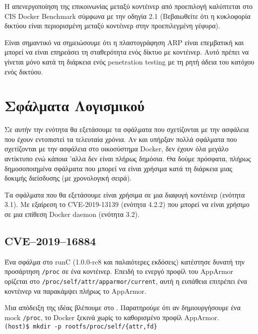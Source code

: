 Η απενεργοποίηση της επικοινωνίας μεταξύ κοντέινερ από προεπιλογή καλύπτεται στο
\textlatin{CIS Docker Benchmark} σύμφωνα με την οδηγία 2.1 (Βεβαιωθείτε ότι η
κυκλοφορία δικτύου είναι περιορισμένη μεταξύ κοντέινερ στην προεπιλεγμένη γέφυρα).

Είναι σημαντικό να σημειώσουμε ότι η πλαστογράφηση \textlatin{ARP} είναι
επεμβατική και μπορεί να είναι επηρεάσει τη σταθερότητα ενός δίκτυο με
κοντέινερ. Αυτό πρέπει να γίνεται μόνο κατά τη διάρκεια ενός
\textlatin{penetration testing} με τη ρητή άδεια του κατόχου ενός δικτύου.

\section{Σφάλματα Λογισμικού}

Σε αυτήν την ενότητα θα εξετάσουμε τα σφάλματα που σχετίζονται με την ασφάλεια
που έχουν εντοπιστεί τα τελευταία χρόνια. Αν και υπήρξαν πολλά σφάλματα που
σχετίζονται με την ασφάλεια στο οικοσύστημα \textlatin{Docker}, δεν έχουν όλα
μεγάλο αντίκτυπο ενώ κάποια 'αλλα δεν είναι πλήρως δημόσια. Θα δούμε πρόσφατα,
πλήρως δημοσοποιημένα σφάλματα που μπορεί να είναι χρήσιμα κατά τη διάρκεια μιας
δοκιμής διείσδυσης (με χρονολογική σειρά).

Τα σφάλματα που θα εξετάσουμε είναι χρήσιμα σε μια διαφυγή κοντέινερ (ενότητα 3.1).
Με εξαίρεση το \textlatin{CVE-2019-13139} (ενότητα 4.2.2) που μπορεί να είναι χρήσιμο
σε μια επίθεση \textlatin{Docker daemon} (ενότητα 3.2).

\subsection{\textlatin{CVE–2019–16884}}

Ένα σφάλμα στο \textlatin{runC (1.0.0-rc8} και παλαιότερες εκδόσεις) κατέστησε
δυνατή την προσάρτηση \texttt{\textlatin{/proc}} σε ένα κοντέινερ. Επειδή το
ενεργό προφίλ του \textlatin{AppArmor} ορίζεται στο
\texttt{\textlatin{/proc/self/attr/apparmor/current}}, αυτή η ευπάθεια επιτρέπει
ένα κοντέινερ να παρακάμψει πλήρως το \textlatin{AppArmor}.

Μια απόδειξη της ιδέας βλέπουμε στο \cite{CVE-2019-16884-Github}. Παρατηρούμε
ότι αν δημιουργήσουμε ένα \textlatin{mock} \texttt{\textlatin{/proc}}, το
\textlatin{Docker} ξεκινά χωρίς το καθορισμένο προφίλ \textlatin{AppArmor}.\\

\texttt{\textlatin{(host)\$ mkdir -p rootfs/proc/self/\{attr,fd\}}}


